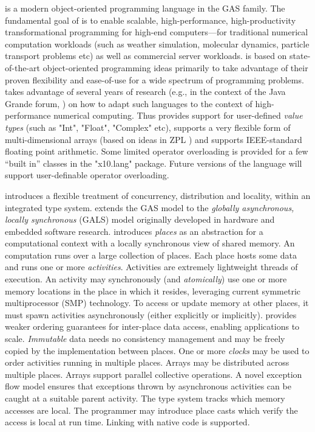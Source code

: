 \Xten{} is a modern object-oriented programming language
in the GAS family. The fundamental goal of \Xten{} is to enable
scalable, high-performance, high-productivity transformational
programming for high-end computers---for traditional numerical
computation workloads (such as weather simulation, molecular dynamics,
particle transport problems etc) as well as commercial server
workloads.
\Xten{} is based on state-of-the-art object-oriented
programming ideas primarily to take advantage of their proven
flexibility and ease-of-use for a wide spectrum of programming
problems. \Xten{} takes advantage of several years of research (e.g.,{}
in the context of the Java Grande forum,
\cite{moreira00java,kava}) on how to adapt such languages to the context of
high-performance numerical computing. Thus \Xten{} provides support
for user-defined {\em value types} (such as \xcd"Int", \xcd"Float",
\xcd"Complex" etc), supports a very
flexible form of multi-dimensional arrays (based on ideas in ZPL
\cite{zpl}) and supports IEEE-standard floating point arithmetic.
Some limited operator overloading is provided for a few ``built in''
classes in the \xcd"x10.lang" package.  Future versions of the
language will support user-definable operator overloading.

{}\Xten{} introduces a flexible treatment of concurrency, distribution
and locality, within an integrated type system. \Xten{} extends the
GAS model to the {\em globally asynchronous, locally synchronous}
(GALS) model originally developed in hardware and embedded software
research.  {}\Xten{} introduces {\em places} as an abstraction for a
computational context with a locally synchronous view of shared
memory. An \Xten{} computation runs over a large collection of places.
Each place hosts some data and runs one or more {\em
activities}. Activities are extremely lightweight threads of
execution. An activity may synchronously (and {\em atomically}) use
one or more memory locations in the place in which it resides,
leveraging current symmetric multiprocessor (SMP) technology.  
To access or update memory at other places, it must 
spawn activities asynchronously (either explicitly or implicitly).
\Xten{} provides weaker ordering guarantees for
inter-place data access, enabling applications to scale.  {\em
Immutable} data needs no consistency management and may be freely
copied by the implementation between places.  One or more {\em clocks}
may be used to order activities running in multiple
places.  Arrays may be distributed across multiple
places. Arrays support parallel collective operations. A novel
exception flow model ensures that exceptions thrown by asynchronous
activities can be caught at a suitable parent activity.  The type
system tracks which memory accesses are local. The programmer may
introduce place casts which verify the access is local at run time.
Linking with native code is supported.

